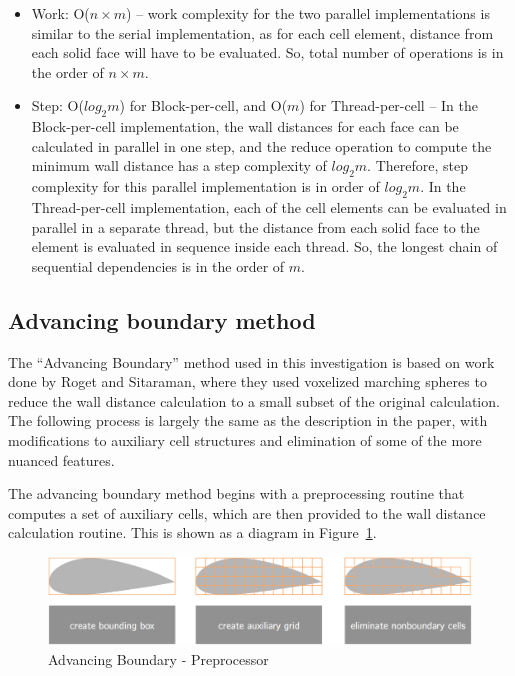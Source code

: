 \documentclass[]{aiaa-tc}%
\begin{document}
\begin{itemize}

\item Work: O($n \times m$) – work complexity for the two parallel
  implementations is similar to the serial implementation, as for each
  cell element, distance from each solid face will have to be
  evaluated.  So, total number of operations is in the order of $n
  \times m$.

\item Step: O($log_2 m$) for Block-per-cell, and O($m$) for
  Thread-per-cell – In the Block-per-cell implementation, the wall
  distances for each face can be calculated in parallel in one step,
  and the reduce operation to compute the minimum wall distance has a
  step complexity of $log_2 m$.  Therefore, step complexity for this
  parallel implementation is in order of $log_2 m$.  In the
  Thread-per-cell implementation, each of the cell elements can be
  evaluated in parallel in a separate thread, but the distance from
  each solid face to the element is evaluated in sequence inside each
  thread.  So, the longest chain of sequential dependencies is in the
  order of $m$.

\end{itemize}



\subsection{Advancing boundary method}
The ``Advancing Boundary'' method used in this investigation is based
on work done by Roget and Sitaraman, where they used
voxelized marching spheres to reduce the wall distance calculation to a small
subset of the original calculation.\cite{roget:12} The following process is largely the
same as the description in the paper, with modifications to auxiliary
cell structures and elimination of some of the more nuanced features.

The advancing boundary method begins with a preprocessing routine that
computes a set of auxiliary cells, which are then provided to the wall
distance calculation routine. This is shown
as a diagram in Figure~\ref{f:ab_preprocessor}.

\begin{figure}
  \centering
  \includegraphics[width=0.6\linewidth]{figures/preprocessor/preprocessor_diagram}
  \caption{Advancing Boundary - Preprocessor}
  \label{f:ab_preprocessor}
\end{figure}
\end{document}
